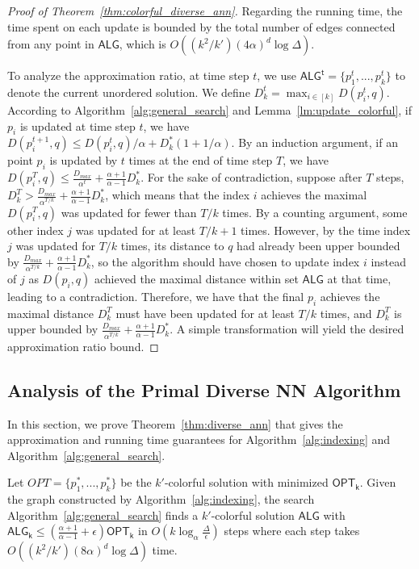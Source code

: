 \begin{proof}[Proof of Theorem~\ref{thm:colorful_diverse_ann}]
Regarding the running time, the time spent on each update is bounded by the total number of edges connected from any point in $\mathsf{ALG}$, which is $O((k^2/k')(4\alpha)^d\log \Delta)$.

To analyze the approximation ratio, at time step $t$, we use $\mathsf{ALG^t}=\{p^t_1,...,p^t_k\}$ to denote the current unordered solution. We define $D^t_k=\max_{i\in[k]}D(p^t_i,q)$. According to Algorithm~\ref{alg:general_search} and Lemma~\ref{lm:update_colorful}, if $p_i$ is updated at time step $t$, we have $D(p^{t+1}_i,q)\le D(p^t_i,q)/\alpha+D^*_k(1+1/\alpha)$. By an induction argument, if an point $p_i$ is updated by $t$ times at the end of time step $T$, we have $D(p^T_i,q)\le \frac{D_{max}}{\alpha^t}+\frac{\alpha+1}{\alpha-1}D^*_k$. For the sake of contradiction, suppose after $T$ steps, $D^T_k>\frac{D_{max}}{\alpha^{T/k}}+\frac{\alpha+1}{\alpha-1}D^*_k$, which means that the index $i$ achieves the maximal $D(p^T_i,q)$ was updated for fewer than $T/k$ times. By a counting argument, some other index $j$ was updated for at least $T/k+1$ times. However, by the time index $j$ was updated for $T/k$ times, its distance to $q$ had already been upper bounded by $\frac{D_{max}}{\alpha^{T/k}}+\frac{\alpha+1}{\alpha-1}D^*_k$, so the algorithm should have chosen to update index $i$ instead of $j$ as $D(p_i,q)$ achieved the maximal distance within set $\mathsf{ALG}$ at that time, leading to a contradiction. Therefore, we have that the final $p_i$ achieves the maximal distance $D^T_k$ must have been updated for at least $T/k$ times, and $D^T_k$ is upper bounded by $\frac{D_{max}}{\alpha^{T/k}}+\frac{\alpha+1}{\alpha-1}D^*_k$. A simple transformation will yield the desired approximation ratio bound.
\end{proof}

\fi

\subsection{Analysis of the Primal Diverse NN Algorithm}\label{sec:primal-analysis}
In this section, we prove Theorem~\ref{thm:diverse_ann} that gives the approximation and running time guarantees for Algorithm~\ref{alg:indexing} and Algorithm~\ref{alg:general_search}.




\iffalse

\begin{corollary}\label{cor:colorful_ann}
Let $OPT=\{p^*_1,...,p^*_k\}$ be the $k'$-colorful solution with minimized $\mathsf{OPT_k}$. Given the graph constructed by Algorithm~\ref{alg:indexing}, the search Algorithm~\ref{alg:general_search} finds a $k'$-colorful solution $\mathsf{ALG}$ with $\mathsf{ALG_k}\le \left(\frac{\alpha+1}{\alpha-1}+\epsilon\right)\mathsf{OPT_k}$ in $O\left(k\log_{\alpha}\frac{\Delta}{\epsilon}\right)$ steps where each step takes $O\left((k^2/k')(8\alpha)^d\log \Delta\right)$ time.
\end{corollary}

